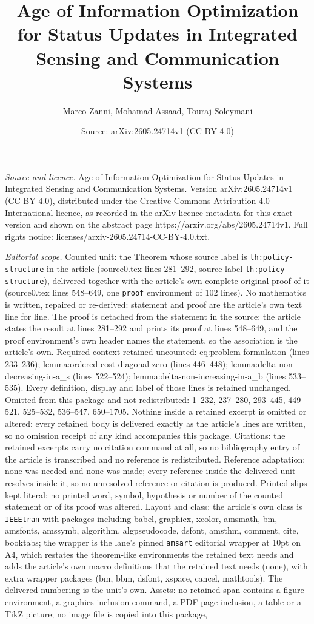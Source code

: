 \documentclass[10pt,a4paper]{amsart}
\title[Age of Information Optimization for Status Updates in Integr]{Age of Information Optimization for Status Updates in Integrated Sensing and Communication Systems}
\author{Marco Zanni, Mohamad Assaad, Touraj Soleymani}
\date{Source: arXiv:2605.24714v1 (CC BY 4.0)}
\begin{document}
\maketitle

\noindent\emph{Source and licence.} Age of Information Optimization for Status Updates in Integrated Sensing and Communication Systems. Version arXiv:2605.24714v1 (CC BY 4.0), distributed under the Creative Commons Attribution 4.0 International licence, as recorded in the arXiv licence metadata for this exact version and shown on the abstract page https://arxiv.org/abs/2605.24714v1. Full rights notice: licenses/arxiv-2605.24714-CC-BY-4.0.txt.\par\smallskip

\noindent\textit{Editorial scope.} Counted unit: the Theorem whose source label is \texttt{th:policy-structure} in the article (source0.tex lines 281--292, source label \texttt{th:policy-structure}), delivered together with the article's own complete original proof of it (source0.tex lines 548--649, one \texttt{proof} environment of 102 lines). No mathematics is written, repaired or re-derived: statement and proof are the article's own text line for line. The proof is detached from the statement in the source: the article states the result at lines 281--292 and prints its proof at lines 548--649, and the proof environment's own header names the statement, so the association is the article's own. Required context retained uncounted: eq:problem-formulation (lines 233--236); lemma:ordered-cost-diagonal-zero (lines 446--448); lemma:delta-non-decreasing-in-a\_s (lines 522--524); lemma:delta-non-increasing-in-a\_b (lines 533--535). Every definition, display and label of those lines is retained unchanged. Omitted from this package and not redistributed: 1--232, 237--280, 293--445, 449--521, 525--532, 536--547, 650--1705. Nothing inside a retained excerpt is omitted or altered: every retained body is delivered exactly as the article's lines are written, so no omission receipt of any kind accompanies this package. Citations: the retained excerpts carry no citation command at all, so no bibliography entry of the article is transcribed and no reference is redistributed. Reference adaptation: none was needed and none was made; every reference inside the delivered unit resolves inside it, so no unresolved reference or citation is produced. Printed slips kept literal: no printed word, symbol, hypothesis or number of the counted statement or of its proof was altered. Layout and class: the article's own class is \texttt{IEEEtran} with packages including babel, graphicx, xcolor, amsmath, bm, amsfonts, amssymb, algorithm, algpseudocode, dsfont, amsthm, comment, cite, booktabs; the wrapper is the lane's pinned \texttt{amsart} editorial wrapper at 10pt on A4, which restates the theorem-like environments the retained text needs and adds the article's own macro definitions that the retained text needs (none), with extra wrapper packages (bm, bbm, dsfont, xspace, cancel, mathtools). The delivered numbering is the unit's own. Assets: no retained span contains a figure environment, a graphics-inclusion command, a PDF-page inclusion, a table or a TikZ picture; no image file is copied into this package, 
\end{document}
